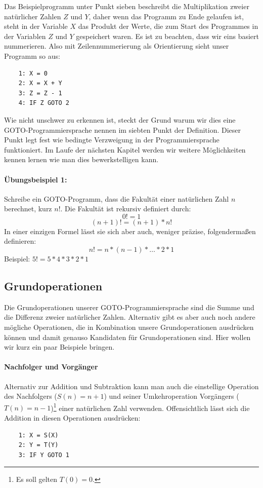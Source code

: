 \documentclass[11pt,a4paper,leqno]{report}
\numberwithin{equation}{chapter}
\begin{document}
Das Beispielprogramm unter Punkt sieben beschreibt die Multiplikation zweier nat\"urlicher Zahlen $Z$ und $Y$, daher wenn das Programm zu Ende gelaufen ist, steht in der Variable $X$ das Produkt der Werte, die zum Start des Programmes in der Variablen $Z$ und $Y$ gespeichert waren. Es ist zu beachten, dass wir eins basiert nummerieren. Also mit Zeilennummerierung als Orientierung sieht unser Programm so aus:
\begin{lstlisting}
	1: X = 0
	2: X = X + Y
	3: Z = Z - 1
	4: IF Z GOTO 2
\end{lstlisting}			
Wie nicht unschwer zu erkennen ist, steckt der Grund warum wir dies eine GOTO-Programmiersprache nennen im siebten Punkt der Definition. Dieser Punkt legt fest wie bedingte Verzweigung in der Programmiersprache funktioniert. Im Laufe der n\"achsten Kapitel werden wir weitere M\"oglichkeiten kennen lernen wie man dies bewerkstelligen kann.
\paragraph{\"Ubungsbeispiel 1:} Schreibe ein GOTO-Programm, dass die Fakult\"at einer nat\"urlichen Zahl $n$ berechnet, kurz $n!$. Die Fakult\"at ist rekursiv definiert durch:
$$0! = 1$$
$$(n + 1)! = (n + 1) * n!$$
In einer einzigen Formel l\"asst sie sich aber auch, weniger pr\"azise, folgenderma\ss{}en definieren:
$$n! = n * (n - 1) * \dots * 2 * 1$$
Beispiel: $5! = 5 * 4 * 3 * 2 * 1$
\subsection{Grundoperationen}
Die Grundoperationen unserer GOTO-Programmiersprache sind die Summe und die Differenz zweier nat\"urlicher Zahlen. Alternativ gibt es aber auch noch andere m\"ogliche Operationen, die in Kombination unsere Grundoperationen ausdr\"ucken k\"onnen und damit genauso Kandidaten f\"ur Grundoperationen sind. Hier wollen wir kurz ein paar Beispiele bringen.
\paragraph{Nachfolger und Vorg\"anger}
Alternativ zur Addition und Subtraktion kann man auch die einstellige Operation des Nachfolgers ($S(n) = n + 1$) und seiner Umkehroperation Vorg\"angers ($T(n) = n - 1$)\footnote{Es soll gelten $T(0)=0$.} einer nat\"urlichen Zahl verwenden. Offensichtlich l\"asst sich die Addition in diesen Operationen ausdr\"ucken:
\begin{lstlisting}
	1: X = S(X)
	2: Y = T(Y)
	3: IF Y GOTO 1
\end{lstlisting}	
\end{document}
